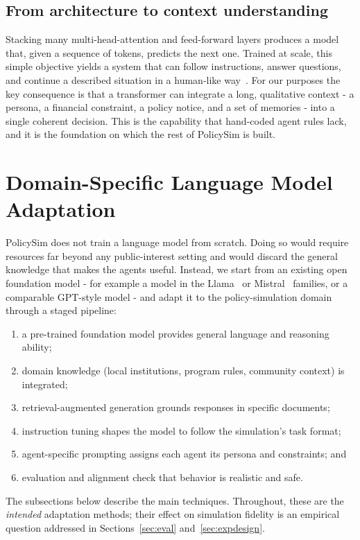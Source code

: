 \documentclass[conference]{IEEEtran}
\begin{document}
\subsection{From architecture to context understanding}
Stacking many multi-head-attention and feed-forward layers produces a model that, given a sequence of tokens, predicts the next one. Trained at scale, this simple objective yields a system that can follow instructions, answer questions, and continue a described situation in a human-like way~\cite{brown2020}. For our purposes the key consequence is that a transformer can integrate a long, qualitative context - a persona, a financial constraint, a policy notice, and a set of memories - into a single coherent decision. This is the capability that hand-coded agent rules lack, and it is the foundation on which the rest of PolicySim is built.

\section{Domain-Specific Language Model Adaptation}
\label{sec:adapt}

PolicySim does not train a language model from scratch. Doing so would require resources far beyond any public-interest setting and would discard the general knowledge that makes the agents useful. Instead, we start from an existing open foundation model - for example a model in the Llama~\cite{touvron2023} or Mistral~\cite{jiang2023} families, or a comparable GPT-style model - and adapt it to the policy-simulation domain through a staged pipeline:
\begin{enumerate}
\item a pre-trained foundation model provides general language and reasoning ability;
\item domain knowledge (local institutions, program rules, community context) is integrated;
\item retrieval-augmented generation grounds responses in specific documents;
\item instruction tuning shapes the model to follow the simulation's task format;
\item agent-specific prompting assigns each agent its persona and constraints; and
\item evaluation and alignment check that behavior is realistic and safe.
\end{enumerate}
The subsections below describe the main techniques. Throughout, these are the \emph{intended} adaptation methods; their effect on simulation fidelity is an empirical question addressed in Sections~\ref{sec:eval} and~\ref{sec:expdesign}.
\end{document}
